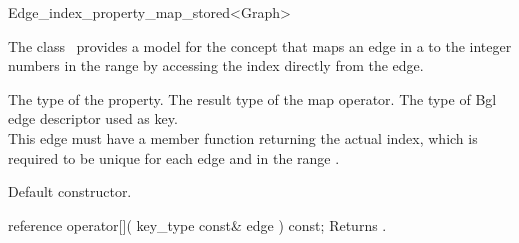 

\begin{ccRefClass}{Edge_index_property_map_stored<Graph>}


\ccDefinition

The class \ccRefName\ provides a model for the concept 
that maps an edge in a
to the integer numbers in the range
by accessing the index directly from the edge.


\ccTypes
    {The type of the property.}
\ccGlue
    {The result type of the map operator.}
\ccGlue
\ccGlue
  {The type of {\sc Bgl} edge descriptor used as key.\\
   This edge must have a member function 
   returning the actual index, which is required to be unique for each edge
   and in the range .
  }

\ccCreation
{}  %

{Default constructor.}

\ccOperations

\ccMethod
  {reference operator[]( key_type const& edge ) const;}
  {Returns .}  
    
\ccIsModel
{}

\ccSeeAlso
{}\\

\end{ccRefClass}


